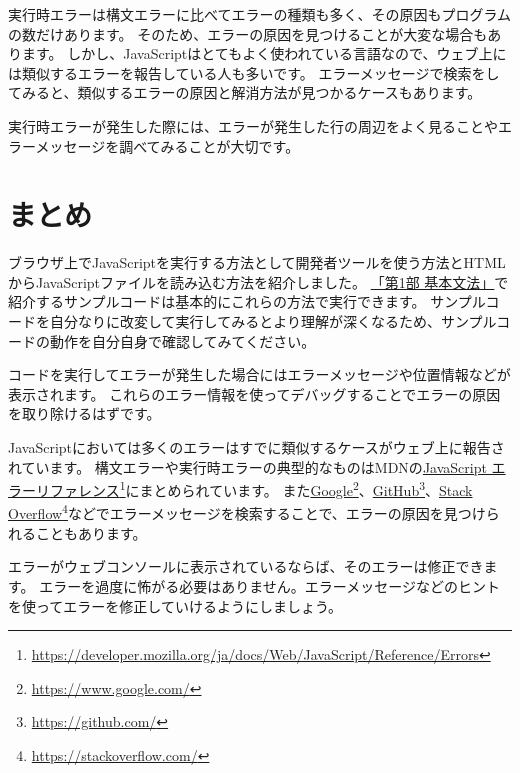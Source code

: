 実行時エラーは構文エラーに比べてエラーの種類も多く、その原因もプログラムの数だけあります。
そのため、エラーの原因を見つけることが大変な場合もあります。
しかし、JavaScriptはとてもよく使われている言語なので、ウェブ上には類似するエラーを報告している人も多いです。
エラーメッセージで検索をしてみると、類似するエラーの原因と解消方法が見つかるケースもあります。

実行時エラーが発生した際には、エラーが発生した行の周辺をよく見ることやエラーメッセージを調べてみることが大切です。

\hypertarget{conclusion}{%
\section{まとめ}\label{conclusion}}

ブラウザ上でJavaScriptを実行する方法として開発者ツールを使う方法とHTMLからJavaScriptファイルを読み込む方法を紹介しました。
\hyperlink{basic-grammar}{「第1部 基本文法」}で紹介するサンプルコードは基本的にこれらの方法で実行できます。
サンプルコードを自分なりに改変して実行してみるとより理解が深くなるため、サンプルコードの動作を自分自身で確認してみてください。

コードを実行してエラーが発生した場合にはエラーメッセージや位置情報などが表示されます。
これらのエラー情報を使ってデバッグすることでエラーの原因を取り除けるはずです。

JavaScriptにおいては多くのエラーはすでに類似するケースがウェブ上に報告されています。
構文エラーや実行時エラーの典型的なものはMDNの\href{https://developer.mozilla.org/ja/docs/Web/JavaScript/Reference/Errors}{JavaScript
エラーリファレンス}\footnote{\url{https://developer.mozilla.org/ja/docs/Web/JavaScript/Reference/Errors}}にまとめられています。
また\href{https://www.google.com/}{Google}\footnote{\url{https://www.google.com/}}、\href{https://github.com/}{GitHub}\footnote{\url{https://github.com/}}、\href{https://stackoverflow.com/}{Stack
Overflow}\footnote{\url{https://stackoverflow.com/}}などでエラーメッセージを検索することで、エラーの原因を見つけられることもあります。

エラーがウェブコンソールに表示されているならば、そのエラーは修正できます。
エラーを過度に怖がる必要はありません。エラーメッセージなどのヒントを使ってエラーを修正していけるようにしましょう。
